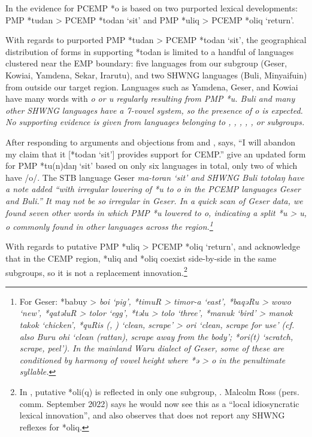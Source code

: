 In \citet[247--249]{Blust1993} the evidence for PCEMP *o is based on
two purported lexical developments: PMP *tudan > PCEMP *todan
‘sit’ and PMP *uliq > PCEMP *oliq ‘return’.

With regards to purported PMP *tudan > PCEMP *todan ‘sit’,
the geographical distribution of forms in \citet{Blust1993} supporting
*todan is limited to a handful of languages clustered near the
EMP boundary: five languages from our 
subgroup (Geser, Kowiai, Yamdena, Sekar, Irarutu),
and two SHWNG languages (Buli,
Minyaifuin) from outside our target region.
Languages such as Yamdena,
Geser, and Kowiai have many words with \it{o} or \it{u} regularly
resulting from PMP *u.
Buli and many other SHWNG languages have a 7-vowel system,
so the presence of \it{o} is expected.
No supporting evidence is given from languages belonging to ,
, , ,
, or  subgroups.

After responding to arguments
and objections from \citet{Nothofer1992}
and \citet{DonohueGrimes2008},
\citet[57]{Blust2009} says, “I will abandon my claim that it
[*todan ‘sit’] provides support for CEMP.” \citet{BlustTrussel2020}
give an updated form for PMP *tu(n)daŋ ‘sit’ based on only six
languages in total, only two of which have /o/.
The STB language Geser \it{ma-toran} ‘sit’
and SHWNG Buli \it{totolaŋ} have a note added “with irregular
lowering of *u to \it{o} in the PCEMP languages Geser
and Buli.” It may not be so irregular in Geser.
In a quick scan of Geser data,
we found seven other words in which PMP *u lowered to \it{o},
indicating a split *u > \it{u,
o} commonly found in other languages across the region.\footnote{
		For
		Geser: *babuy > \it{boi} ‘pig’,
		*timuR > \it{timor-a} ‘east’,
		*baqəRu > \it{wowo} ‘new’,
		*qatəluR > \it{tolor} ‘egg’,
		*təlu > \it{tolo} ‘three’,
		*manuk ‘bird’ > \it{manok takok} ‘chicken’,
		*quRis (, \citealp{ZorcCharles1971}) ‘clean,
		scrape’ > \it{ori} ‘clean,
		scrape for use’ (cf.
		also Buru \it{ohi} ‘clean (rattan),
		scrape away from the body’;  *ori(t) ‘scratch, scrape, peel’).
		In the mainland Waru dialect of Geser,
		some of these are conditioned by harmony of vowel height where
		*ə > \it{o} in the penultimate syllable.}

With regards to putative PMP *uliq > PCEMP *oliq ‘return’,
\citet{Blust2009} and \citet{BlustTrussel2020} acknowledge
that in the CEMP region,
*uliq and *oliq coexist side-by-side in the same subgroups,
so it is not a replacement innovation.\footnote{
In \citet[410f]{Ross2016},
putative  *oli(q) is reflected in only one subgroup,
. Malcolm Ross (pers. comm.
September 2022) says he would now see this as a “local idiosyncratic
lexical innovation”, and also observes that \citet{Kamholz2014} does not report any
SHWNG reflexes for *oliq.}

